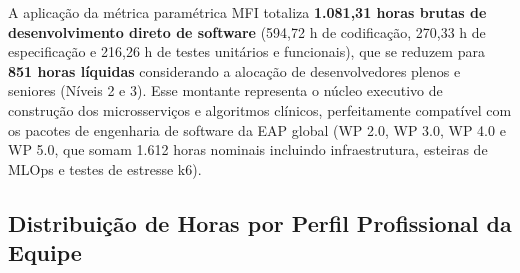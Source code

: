 A aplicação da métrica paramétrica MFI totaliza \textbf{1.081,31 horas brutas de desenvolvimento direto de software} (594,72 h de codificação, 270,33 h de especificação e 216,26 h de testes unitários e funcionais), que se reduzem para \textbf{851 horas líquidas} considerando a alocação de desenvolvedores plenos e seniores (Níveis 2 e 3). Esse montante representa o núcleo executivo de construção dos microsserviços e algoritmos clínicos, perfeitamente compatível com os pacotes de engenharia de software da EAP global (WP 2.0, WP 3.0, WP 4.0 e WP 5.0, que somam 1.612 horas nominais incluindo infraestrutura, esteiras de MLOps e testes de estresse k6).

\subsection{Distribuição de Horas por Perfil Profissional da Equipe}

